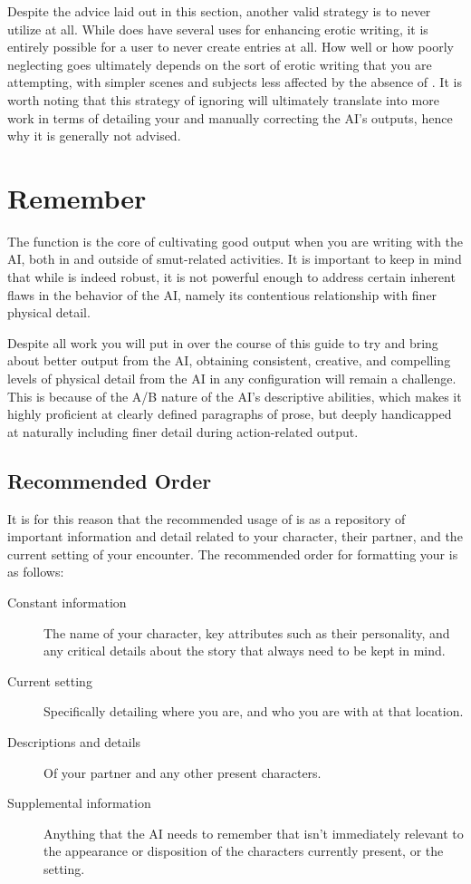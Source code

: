 \documentclass[Coomer-main.tex]{subfiles}
\begin{document}
Despite the advice laid out in this section, another valid strategy is to never utilize \wi at all.
While \wi does have several uses for enhancing erotic writing, it is entirely possible for a user to never create \wi entries at all.
How well or how poorly neglecting \wi goes ultimately depends on the sort of erotic writing that you are attempting, with simpler scenes and subjects less affected by the absence of \wi.
It is worth noting that this strategy of ignoring \wi will ultimately translate into more work in terms of detailing your \rem and manually correcting the AI’s outputs, hence why it is generally not advised.

\chapter{Remember}
\label{ch:remember}

The \rem function is the core of cultivating good output when you are writing with the AI, both in and outside of smut-related activities.
It is important to keep in mind that while \rem is indeed robust, it is not powerful enough to address certain inherent flaws in the behavior of the AI, namely its contentious relationship with finer physical detail.

Despite all work you will put in over the course of this guide to try and bring about better output from the AI, obtaining consistent, creative, and compelling levels of physical detail from the AI in any configuration will remain a challenge.
This is because of the A/B nature of the AI’s descriptive abilities, which makes it highly proficient at clearly defined paragraphs of prose, but deeply handicapped at naturally including finer detail during action-related output.

\section{Recommended Order}
\label{sec:recomorder}

It is for this reason that the recommended usage of \rem is as a repository of important information and detail related to your character, their partner, and the current setting of your encounter.
The recommended order for formatting your \rem is as follows:

\begin{description}

\item[Constant information]
	The name of your character, key attributes such as their personality, and any critical details about the story that always need to be kept in mind.
\item[Current setting]
	Specifically detailing where you are, and who you are with at that location.
\item[Descriptions and details]
	Of your partner and any other present characters.
\item[Supplemental information]
	Anything that the AI needs to remember that isn’t immediately relevant to the appearance or disposition of the characters currently present, or the setting.

\end{description}
\end{document}

